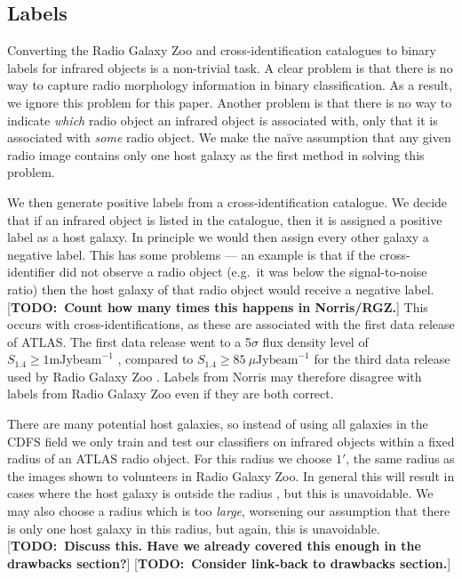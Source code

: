\documentclass[fleqn,usenatbib,usedcolumn]{mnras}
\newcommand{\text}{\mathrm}
\newcommand{\todo}[1]{ {\color{red}[{\bf TODO:~{#1}}]} }
\begin{document}
  \subsection{Labels}\label{labels}

    Converting the Radio Galaxy Zoo and \citet{norris06} cross-identification
    catalogues to binary labels for infrared objects is a non-trivial task. A
    clear problem is that there is no way to capture radio morphology
    information in binary classification. As a result, we ignore this problem
    for this paper. Another problem is that there is no way to indicate
    \emph{which} radio object an infrared object is associated with, only that
    it is associated with \emph{some} radio object. We make the na\"ive
    assumption that any given radio image contains only one host galaxy as the
    first method in solving this problem.

    We then generate positive labels from a cross-identification catalogue.
    We decide that if an infrared object is listed in the catalogue, then it
    is assigned a positive label as a host galaxy. In principle we would
    then assign every other galaxy a negative label. This has some problems
    --- an example is that if the cross-identifier did not observe a radio
    object (e.g.~it was below the signal-to-noise ratio) then the host galaxy
    of that radio object would receive a negative label.
    \todo{Count how many times this happens in Norris/RGZ.} This occurs
    with \citet{norris06} cross-identifications, as these are associated with
    the first data release of ATLAS. The first data release went to a
    5$\sigma$ flux density level of $S_{1.4} \geq 1 \text{ mJy beam}^{-1}$
    \citep{norris06}, compared to $S_{1.4} \geq 85\ \mu\text{Jy beam}^{-1}$
    for the third data release used by Radio Galaxy Zoo \citep{franzen15}.
    Labels from Norris may therefore disagree with labels from Radio Galaxy
    Zoo even if they are both correct.

    There are many potential host galaxies, so instead of using all galaxies
    in the CDFS field we only train and test our classifiers on infrared
    objects within a fixed radius of an ATLAS radio object. For this radius we
    choose $1'$, the same radius as the images shown to volunteers in Radio
    Galaxy Zoo. In general this will result in cases where the host galaxy is
    outside the radius \citep[e.g. the giant radio galaxy shown
    in][]{banfield15}, but this is unavoidable. We may also choose a radius
    which is too \emph{large}, worsening our assumption that there is only one
    host galaxy in this radius, but again, this is unavoidable. \todo{Discuss
    this. Have we already covered this enough in the drawbacks section?}
    \todo{Consider link-back to drawbacks section.}
\end{document}
